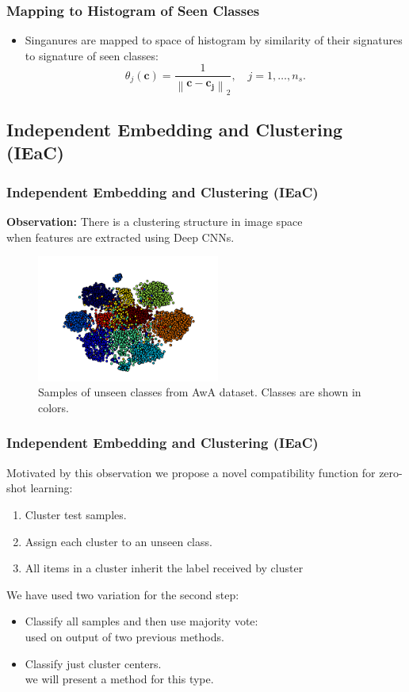 \documentclass{beamer}
\newcommand{\norm}[1]{\left \lVert #1 \right \rVert}
\begin{document}
\begin{frame} \frametitle{Mapping to Histogram of Seen Classes}
  \begin{itemize}
    \item Singanures are mapped to space of histogram by similarity of their signatures to signature of seen classes:
    \begin{equation}
   \theta_j(\mathbf{c}) = \frac{1}{\norm{\mathbf{c - c_j}}_2  }, \quad j=1,\ldots, n_s.
   \end{equation}
\end{itemize}
\end{frame}

%


\subsection{Independent Embedding and Clustering (IEaC)}
\label{sub:Custering and Linear Embedding}
\begin{frame}\frametitle{Independent Embedding and Clustering (IEaC)}
  \textbf{Observation:}  There is a clustering structure in image space \\
  when features are extracted using Deep CNNs.
  \begin{figure}
\includegraphics[width=6cm]{awa_clusters}
\caption{\scriptsize Samples of unseen classes from AwA dataset. Classes are shown in colors.}
  \end{figure}
\end{frame}

\begin{frame}\frametitle{Independent Embedding and Clustering (IEaC)}
  Motivated by this observation we propose a novel compatibility function for zero-shot learning:
  \begin{enumerate}
    \item Cluster test samples.
    \item Assign each cluster to an unseen class.
    \item All items in a cluster inherit the label received by cluster
  \end{enumerate}
  We have used two variation for the second step:
  \begin{itemize}
    \item Classify all samples and then use majority vote:
    \\ used on output of two previous methods.
    \item Classify just cluster centers.
    \\ we will present a method for this type.
  \end{itemize}
\end{frame}
\end{document}
